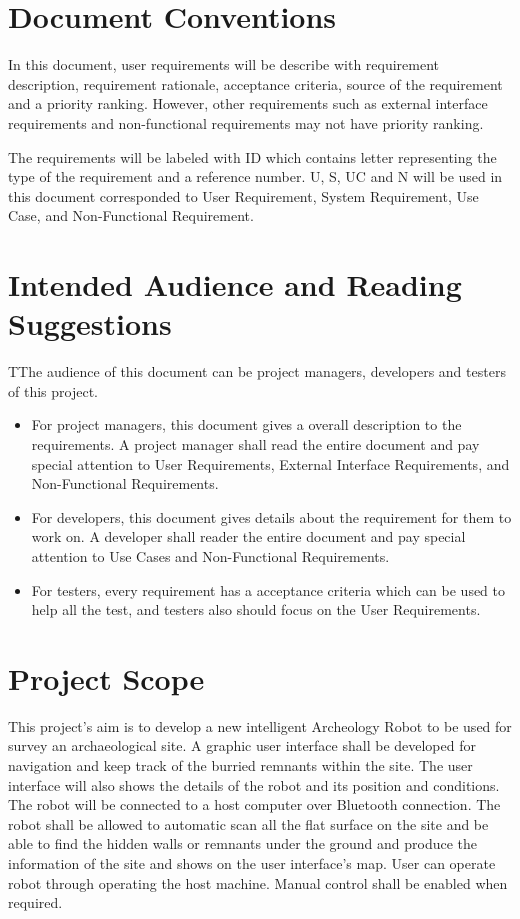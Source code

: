 \documentclass[11pt, a4paper]{report}
\begin{document}
\section{Document Conventions}
In this document, user requirements will be describe with requirement description, requirement rationale, acceptance criteria, source of the requirement and a priority ranking. However, other requirements such as external interface requirements and non-functional requirements may not have priority ranking. 

The requirements will be labeled with ID which contains letter representing the type of the requirement and a reference number. U, S, UC and N will be used in this document corresponded to User Requirement, System Requirement, Use Case, and Non-Functional Requirement. 



\section{Intended Audience and Reading Suggestions}
TThe audience of this document can be project managers, developers and testers of this project. 
\begin{itemize}
\item For project managers, this document gives a overall description to the requirements. A project manager shall read the entire document and pay special attention to User Requirements, External Interface Requirements, and Non-Functional Requirements.
\item For developers, this document gives details about the requirement for them to work on. A developer shall reader the entire document and pay special attention to Use Cases and Non-Functional Requirements. 
\item For testers, every requirement has a acceptance criteria which can be used to help all the test, and testers also should focus on the User Requirements. 
\end{itemize}


\section{Project Scope}
This project's aim is to develop a new intelligent Archeology Robot to be used for survey an archaeological site. A graphic user interface shall be developed for navigation and keep track of the burried remnants within the site. The user interface will also shows the details of the robot and its position and conditions. The robot will be connected to a host computer over Bluetooth connection. The robot shall be allowed to automatic scan all the flat surface on the site and be able to find the hidden walls or remnants under the ground and produce the information of the site and shows on the user interface's map. 
User can operate robot through operating the host machine. Manual control shall be enabled when required.
\end{document}
